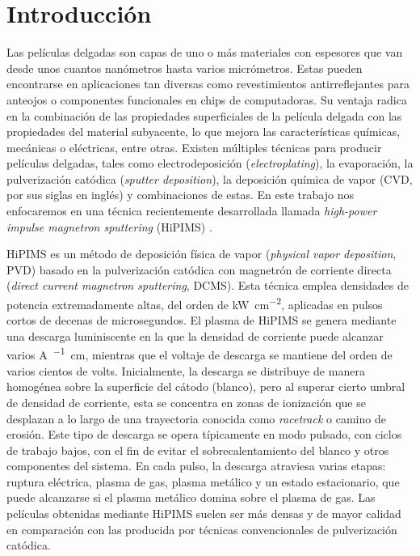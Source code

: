 \documentclass[12pt]{IEEEtran}
\begin{document}
\section{Introducción}
Las películas delgadas son capas de uno o más materiales con espesores que van desde unos cuantos nanómetros hasta varios micrómetros. Estas pueden encontrarse en aplicaciones tan diversas como revestimientos antirreflejantes para anteojos o componentes funcionales en chips de computadoras. Su ventaja radica en la combinación de las propiedades superficiales de la película delgada con las propiedades del material subyacente, lo que mejora las características químicas, mecánicas o eléctricas, entre otras.
Existen múltiples técnicas para producir películas delgadas, tales como electrodeposición (\emph{electroplating}), la evaporación, la pulverización catódica (\emph{sputter deposition}), la deposición química de vapor  (CVD, por sus siglas en inglés) y combinaciones de estas. En este trabajo nos enfocaremos en una técnica recientemente desarrollada llamada \emph{high-power impulse magnetron sputtering} (HiPIMS) \cite{lundinHiPIMSProcess2010}.

HiPIMS es un método de deposición física de vapor (\emph{physical vapor deposition}, PVD) basado en la pulverización catódica con magnetrón de corriente directa (\emph{direct current magnetron sputtering}, DCMS). Esta técnica emplea densidades de potencia extremadamente altas, del orden de \unit{\kW\per\cm^{2}}, aplicadas en pulsos cortos de decenas de microsegundos. El plasma de HiPIMS se genera mediante una descarga luminiscente en la que la densidad de corriente puede alcanzar varios \unit{\A\per\squared\cm}, mientras que el voltaje de descarga se mantiene del orden de varios cientos de volts. Inicialmente, la descarga se distribuye de manera homogénea sobre la superficie del cátodo (blanco), pero al superar cierto umbral de densidad de corriente, esta se concentra en zonas de ionización que se desplazan a lo largo de una trayectoria conocida como \emph{racetrack} o camino de erosión. Este tipo de descarga se opera típicamente en modo pulsado, con ciclos de trabajo bajos, con el fin de evitar el sobrecalentamiento del blanco y otros componentes del sistema. En cada pulso, la descarga atraviesa varias etapas: ruptura eléctrica, plasma de gas, plasma metálico y un estado estacionario, que puede alcanzarse si el plasma metálico domina sobre el plasma de gas. Las películas obtenidas mediante HiPIMS suelen ser más densas y de mayor calidad en comparación con las producida por técnicas convencionales de pulverización catódica.
\end{document}
